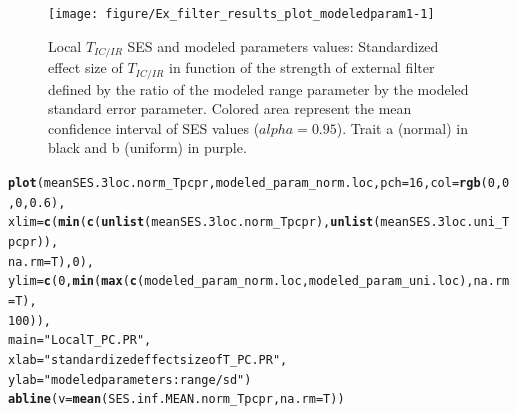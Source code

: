 \documentclass[12pt]{article}\usepackage[]{graphicx}\usepackage[]{color}
\makeatletter
\newcommand{\hlnum}[1]{\textcolor[rgb]{0.686,0.059,0.569}{#1}}%
\newcommand{\hlstr}[1]{\textcolor[rgb]{0.192,0.494,0.8}{#1}}%
\newcommand{\hlstd}[1]{\textcolor[rgb]{0.345,0.345,0.345}{#1}}%
\newcommand{\hlkwc}[1]{\textcolor[rgb]{0.333,0.667,0.333}{#1}}%
\newcommand{\hlkwd}[1]{\textcolor[rgb]{0.737,0.353,0.396}{\textbf{#1}}}%
\newenvironment{kframe}{%
 \def\at@end@of@kframe{}%
 \ifinner\ifhmode%
  \def\at@end@of@kframe{\end{minipage}}%
  \begin{minipage}{\columnwidth}%
 \fi\fi%
 \def\FrameCommand##1{\hskip\@totalleftmargin \hskip-\fboxsep
 \colorbox{shadecolor}{##1}\hskip-\fboxsep
     \hskip-\linewidth \hskip-\@totalleftmargin \hskip\columnwidth}%
 \MakeFramed {\advance\hsize-\width
   \@totalleftmargin\z@ \linewidth\hsize
   \@setminipage}}%
 {\par\unskip\endMakeFramed%
 \at@end@of@kframe}
\newenvironment{knitrout}{}{} %
\makeatother
\begin{document}
\begin{knitrout}
\begin{figure}
{\centering \texttt{[image: figure/Ex\_filter\_results\_plot\_modeledparam1-1]} 

}

\caption[Local $T_{IC/IR}$ SES and modeled parameters values]{Local $T_{IC/IR}$ SES and modeled parameters values: Standardized effect size of $T_{IC/IR}$ in function of the strength of external filter defined by the ratio of the modeled range parameter by the modeled standard error parameter. Colored area represent the mean confidence interval of SES values ($alpha = 0.95$). Trait a (normal) in black and b (uniform) in purple.\label{fig:Ex_filter_results_plot_modeledparam1}}
\end{figure}


\end{knitrout}

\begin{knitrout}\small
{}\color{fgcolor}\begin{kframe}
\begin{alltt}
\hlkwd{plot}\hlstd{(meanSES.3loc.norm_Tpcpr, modeled_param_norm.loc,} \hlkwc{pch} \hlstd{=} \hlnum{16}\hlstd{,} \hlkwc{col} \hlstd{=} \hlkwd{rgb}\hlstd{(}\hlnum{0}\hlstd{,} \hlnum{0}\hlstd{,} \hlnum{0}\hlstd{,} \hlnum{0.6}\hlstd{),}
     \hlkwc{xlim} \hlstd{=} \hlkwd{c}\hlstd{(}\hlkwd{min}\hlstd{(}\hlkwd{c}\hlstd{(}\hlkwd{unlist}\hlstd{(meanSES.3loc.norm_Tpcpr),} \hlkwd{unlist}\hlstd{(meanSES.3loc.uni_Tpcpr)),}
              \hlkwc{na.rm} \hlstd{= T),} \hlnum{0}\hlstd{),}
     \hlkwc{ylim} \hlstd{=} \hlkwd{c}\hlstd{(}\hlnum{0}\hlstd{,} \hlkwd{min}\hlstd{(}\hlkwd{max}\hlstd{(}\hlkwd{c}\hlstd{(modeled_param_norm.loc, modeled_param_uni.loc),} \hlkwc{na.rm} \hlstd{= T),}
                     \hlnum{100}\hlstd{)),}
     \hlkwc{main} \hlstd{=} \hlstr{"Local T_PC.PR"}\hlstd{,}
     \hlkwc{xlab} \hlstd{=} \hlstr{"standardized effect size of T_PC.PR"}\hlstd{,}
     \hlkwc{ylab} \hlstd{=} \hlstr{"modeled parameters: range/sd"}\hlstd{)}
\hlkwd{abline}\hlstd{(}\hlkwc{v} \hlstd{=} \hlkwd{mean}\hlstd{(SES.inf.MEAN.norm_Tpcpr,} \hlkwc{na.rm} \hlstd{= T))}


\end{alltt}
\end{kframe}
\end{knitrout}
\end{document}
